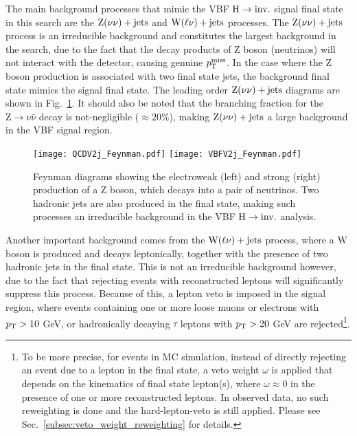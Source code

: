 The main background processes that mimic the VBF $\textrm{H} \rightarrow \textrm{inv.}$ signal final state in this search are the $\textrm{Z}(\nu\nu)+\textrm{jets}$ and $\textrm{W}(\ell\nu)+\textrm{jets}$ processes. 
The $\textrm{Z}(\nu\nu)+\textrm{jets}$ process is an irreducible background and constitutes the largest background in the search, due to the fact that the decay
products of $\textrm{Z}$ boson (neutrinos) will not interact with the detector, causing genuine $p_{\textrm{T}}^{\textrm{miss}}$. 
In the case where the $\textrm{Z}$ boson production
is associated with two final state jets, the background final state mimics the signal final state. The leading order $\textrm{Z}(\nu\nu)+\textrm{jets}$ diagrams
are shown in Fig.~\ref{fig:zvv_bkg_feynman}. It should also be noted that the branching fraction for the $\textrm{Z} \rightarrow \nu\bar{\nu}$ decay is
not-negligible ($\approx 20\%$), making $\textrm{Z}(\nu\nu)+\textrm{jets}$ a large background in the VBF signal region. 

\begin{figure}[htbp!]
    \centering
    \texttt{[image: QCDV2j\_Feynman.pdf]}
    \texttt{[image: VBFV2j\_Feynman.pdf]}
    \caption{Feynman diagrams showing the electroweak (left) and strong (right) production of a $\textrm{Z}$ boson, which decays into
    a pair of neutrinos. Two hadronic jets are also produced in the final state, making such processes an irreducible background
    in the VBF $\textrm{H} \rightarrow \textrm{inv.}$ analysis.}
    \label{fig:zvv_bkg_feynman}
\end{figure}

Another important background comes from the $\textrm{W}(\ell\nu)+\textrm{jets}$ process, where a $\textrm{W}$ boson is produced and decays leptonically,
together with the presence of two hadronic jets in the final state.
This is not an irreducible background however, due to the fact that rejecting events with reconstructed leptons
will significantly suppress this process. Because of this, a lepton veto is imposed in the signal region, where  
events containing one or more loose muons or electrons with $p_{\textrm{T}} >10$ GeV, or hadronically decaying $\tau$ 
leptons with $p_{\textrm{T}}>20$ GeV are rejected\footnote{To be more precise, for events in MC simulation, 
instead of directly rejecting an event due to
a lepton in the final state, a veto weight $\omega$ is applied that depends on the kinematics of final state lepton(s), where
$\omega \approx 0$ in the presence of one or more reconstructed leptons. In observed data, no such reweighting is done and
the hard-lepton-veto is still applied. Please see Sec.~\ref{subsec:veto_weight_reweighting}
for details.}. 

